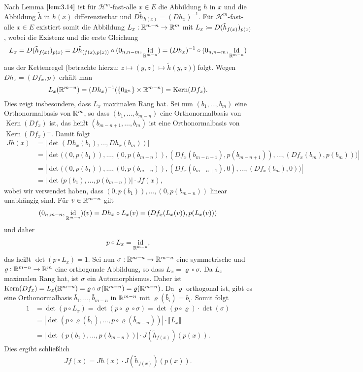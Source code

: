\documentclass[a4paper,twoside,DIV15,BCOR12mm]{scrbook}
\newcommand{\HM}{\mathscr H}
\DeclareMathOperator{\id}{id}
\DeclareMathOperator{\Kern}{Kern}
\begin{document}
\begin{beweis}
Nach Lemma $\ref{lem:3.14}$ ist für $\HM^m$-fast-alle $x\in E$ die Abbildung $h$ in $x$ und die Abbildung $\tilde h$ in $h(x)$ differenzierbar und $D\tilde h_{h(x)} = (Dh_x)^{-1}$. Für $\HM^m$-fast-alle $x\in E$ existiert somit die Abbildung $L_x:\mathbb{R}^{m-n}\to\mathbb{R}^m$ mit $L_x\da D(\tilde h_{f(x)})_{p(x)}$, wobei die Existenz und die erste  Gleichung
$$
L_x= D(\tilde h_{f(x)})_{p(x)} 
= D\tilde h_{(f(x),p(x))} \circ (0_{n,n-m}, \id_{\MdR^{m-n}})=(D h_x)^{-1}\circ (0_{n,n-m}, \id_{\MdR^{m-n}})
$$
aus der Kettenregel  (betrachte hierzu: $z\mapsto (y,z)\mapsto \tilde h(y,z)$) folgt. Wegen 
$Dh_x = (Df_x,p)$ erhält man  
\begin{align*}
L_x(\MdR^{m-n}) = (Dh_x)^{-1}(\{0_{\MdR^n}\} \times \MdR^{m-n}) = \Kern(Df_x).
\end{align*}
Dies zeigt insbesondere, dass $L_x$ maximalen Rang hat. 
Sei nun $(b_1,\ldots,b_m)$ eine Orthonormalbasis von $\mathbb{R}^m$, so dass $(b_1,\ldots,b_{m-n})$ eine Orthonormalbasis von $\Kern(Df_x)$ ist, das heißt $(b_{m-n+1},\ldots,b_m)$ ist eine Orthonormalbasis von $\Kern(Df_x)^\bot$. Damit folgt
\begin{align*}
Jh(x) 
&= |\det(Dh_x(b_1),\ldots,Dh_x(b_m))|\\
&= |\det\big( (0,p(b_1)),\ldots,(0,p(b_{m-n})), (Df_x(b_{m-n+1}),p(b_{m-n+1})),\ldots,(Df_x(b_{m}),p(b_{m}))\big)|\\
&= |\det\big( (0,p(b_1)),\ldots,(0,p(b_{m-n})), (Df_x(b_{m-n+1}),0),\ldots,(Df_x(b_{m}),0)\big)|\\
&= |\det\big( p(b_1),\ldots,p(b_{m-n})\big)| \cdot Jf(x) ,
\end{align*}
wobei wir verwendet haben, dass $(0,p(b_1)),\ldots,(0,p(b_{m-n}))$ linear unabhängig sind. 
Für $v\in\mathbb{R}^{m-n}$ gilt
\begin{align*}
(0_{n,m-n}, \id_{\MdR^{m-n}})(v) = Dh_x \circ L_x(v) = (Df_x(L_x(v)), p(L_x(v))) 
\end{align*}
und daher
\begin{align*}
p\circ L_x = \id_{\MdR^{m-n}},
\end{align*}
das heißt $\det(p\circ L_x)=1$. Sei nun $\sigma:\mathbb{R}^{m-n} \to \mathbb{R}^{m-n}$ eine symmetrische und $\varrho:\mathbb{R}^{m-n}\to\mathbb{R}^m$ eine orthogonale Abbildung, so dass $L_x=\varrho \circ \sigma$. Da $L_x$ 
maximalen Rang hat, ist $\sigma$ ein Automorphismus. Daher ist $\Kern(Df_x) = L_x(\MdR^{m-n}) = \varrho\circ\sigma(\MdR^{m-n}) = \varrho(\MdR^{m-n})$. Da $\varrho$ orthogonal ist, gibt es eine Orthonormalbasis $\bar b_1,\ldots,\bar b_{m-n}$ in $ \mathbb{R}^{m-n}$ mit $\varrho(\bar b_i) = b_i$. Somit folgt
\begin{align*}
1 &= \det(p\circ L_x) = \det(p\circ\varrho\circ\sigma) = \det(p\circ \varrho) \cdot \det(\sigma) \\
&= |\det( p\circ\varrho(\bar b_1), \ldots, p\circ\varrho(\bar b_{m-n}))| \cdot \llbracket L_x\rrbracket \\
&= |\det( p(b_1), \ldots, p(b_{m-n}))| \cdot J(\tilde h_{f(x)})(p(x)).
\end{align*}
Dies ergibt schließlich
\begin{align*}
Jf(x) = Jh(x) \cdot J(\tilde h_{f(x)}) (p(x)).
\end{align*}


\end{beweis}
\end{document}
